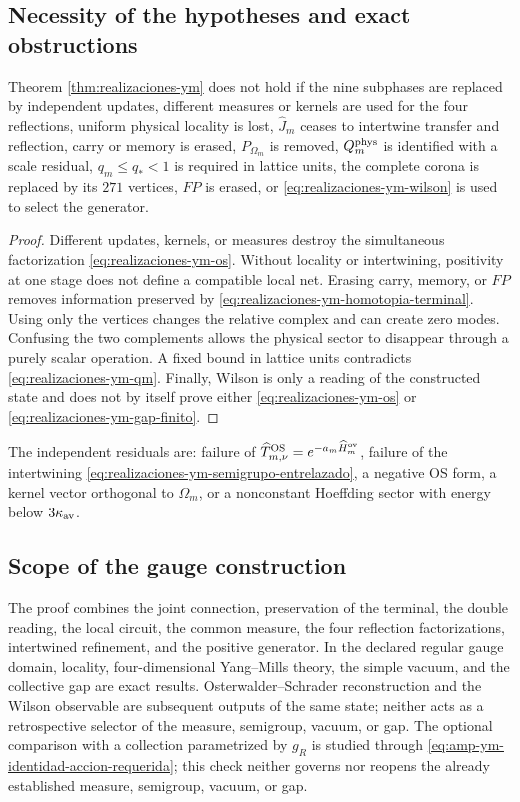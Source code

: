 \subsection*{Necessity of the hypotheses and exact obstructions}

\begin{ablation}
\label{abl:realizaciones-ym}
Theorem \ref{thm:realizaciones-ym} does not hold if the
nine subphases are replaced by independent updates, different measures or
kernels are used for the four reflections, uniform physical locality
is lost, \(\widehat J_m\) ceases to intertwine transfer and reflection,
carry or memory is erased, \(P_{\Omega_m}\) is removed,
\(Q_m^{\rm phys}\) is identified with a scale residual,
\(q_m\leq q_*<1\) is required in lattice units, the complete corona is replaced
by its \(271\) vertices, \(FP\) is erased, or
\eqref{eq:realizaciones-ym-wilson} is used to select the generator.
\end{ablation}

\begin{proof}
Different updates, kernels, or measures destroy the simultaneous
factorization \eqref{eq:realizaciones-ym-os}. Without locality or intertwining,
positivity at one stage does not define a compatible local net. Erasing carry,
memory, or \(FP\) removes information preserved by
\eqref{eq:realizaciones-ym-homotopia-terminal}. Using only the
vertices changes the relative complex and can create zero modes. Confusing
the two complements allows the physical sector to disappear through a
purely scalar operation. A fixed bound in lattice units contradicts
\eqref{eq:realizaciones-ym-qm}. Finally, Wilson is only a reading of the
constructed state and does not by itself prove either
\eqref{eq:realizaciones-ym-os} or
\eqref{eq:realizaciones-ym-gap-finito}.
\end{proof}

The independent residuals are: failure of
\(\widehat T_{m,\nu}^{\rm OS}=e^{-a_m\widehat H_m^{\rm ov}}\), failure of the
intertwining \eqref{eq:realizaciones-ym-semigrupo-entrelazado}, a negative
OS form, a kernel vector orthogonal to \(\Omega_m\), or a nonconstant
Hoeffding sector with energy below \(3\kappa_{\rm av}\).

\subsection*{Scope of the gauge construction}

The proof combines the joint connection, preservation of the terminal, the
double reading, the local circuit, the common measure, the four reflection
factorizations, intertwined refinement, and the positive generator. In the
declared regular gauge domain,
locality, four-dimensional Yang--Mills theory, the simple vacuum, and the
collective gap are exact results. Osterwalder--Schrader
reconstruction and the Wilson observable are
subsequent outputs of the same state; neither acts as a
retrospective selector of the measure, semigroup, vacuum, or
gap. The optional comparison with a collection parametrized by \(g_R\) is studied
through \eqref{eq:amp-ym-identidad-accion-requerida}; this check neither
governs nor reopens the already established measure, semigroup, vacuum, or
gap.
